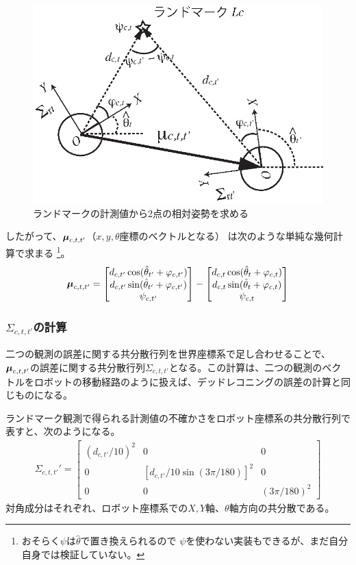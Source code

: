 \begin{figure}[htbp]
	\begin{center}
		\includegraphics[width=0.5\linewidth]{./figs/two_poses.eps}
		\caption{ランドマークの計測値から2点の相対姿勢を求める}
		\label{fig:two_poses}
	\end{center}
\end{figure}

したがって、$\boldsymbol{\mu}_{c,t,t'}$（$x,y,\theta$座標のベクトルとなる）
は次のような単純な幾何計算で求まる
\footnote{おそらく$\psi$は$\hat\theta$で置き換えられるので
$\psi$を使わない実装もできるが、まだ自分自身では検証していない。}。
\begin{align}
	\boldsymbol{\mu}_{c,t,t'} =
	\begin{bmatrix}
	d_{c,t'} \cos(\hat{\theta}_{t'} + \varphi_{c,t'}) \\
	d_{c,t'} \sin(\hat{\theta}_{t'} + \varphi_{c,t'}) \\
	\psi_{c,t'}
	\end{bmatrix}
	- 
	\begin{bmatrix}
	d_{c,t} \cos(\hat{\theta}_t + \varphi_{c,t}) \\
	d_{c,t} \sin(\hat{\theta}_t + \varphi_{c,t}) \\
	\psi_{c,t}
	\end{bmatrix}
\end{align}

\subsubsection{$\Sigma_{c,t,t'}$の計算}

二つの観測の誤差に関する共分散行列を世界座標系で足し合わせることで、	$\boldsymbol{\mu}_{c,t,t'}$の誤差に関する共分散行列$\Sigma_{c,t,t'}$となる。この計算は、二つの観測のベクトルをロボットの移動経路のように扱えば、デッドレコニングの誤差の計算と同じものになる。


ランドマーク観測で得られる計測値の不確かさをロボット座標系の共分散行列で表すと、次のようになる。
\begin{align}
	\Sigma_{c,t,t'}' =
	\begin{bmatrix}
	(d_{c,t'}/10)^2 & 0 & 0 \\
	0 & [d_{c,t'}/10 \sin(3\pi/180)]^2 & 0 \\
	0 & 0 & (3\pi/180)^2
	\end{bmatrix}
\end{align}
対角成分はそれぞれ、ロボット座標系での$X,Y$軸、$\theta$軸方向の共分散である。


